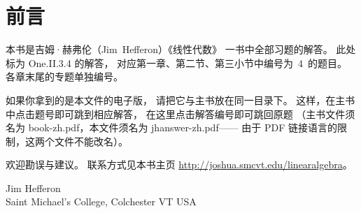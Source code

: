 \documentclass[twoside]{book}
\def\ansfile{bookans-zh}
\begin{document}

\frontmatter
\chapter*{前言}
本书是吉姆·赫弗伦（Jim~Hef{}feron）《线性代数》
一书中全部习题的解答。
此处标为 One.II.3.4 的解答，
对应第一章、第二节、第三小节中编号为~4~的题目。
各章末尾的专题单独编号。

如果你拿到的是本文件的电子版，
请把它与主书放在同一目录下。
这样，在主书中点击题号即可跳到相应解答，
在这里点击解答编号即可跳回原题
（主书文件须名为 book-zh.pdf，本文件须名为 jhanswer-zh.pdf——
由于 PDF 链接语言的限制，这两个文件不能改名）。

欢迎勘误与建议。
联系方式见本书主页
\url{http://joshua.smcvt.edu/linearalgebra}。

\vspace{.5in}
\begin{raggedright}
Jim Hef{}feron     \\
Saint Michael's College, Colchester VT USA \\

\end{raggedright}
\clearemptydoublepage\tableofcontents
\setcounter{page}{1}
\mainmatter
\thispagestyle{empty}

\end{document}

